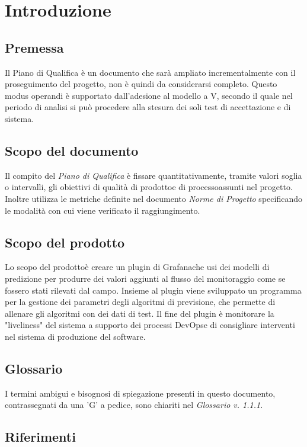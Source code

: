 \section{Introduzione}
	\subsection{Premessa}
	Il Piano di Qualifica è un documento che sarà ampliato incrementalmente con il proseguimento del progetto\glo, non è quindi da considerarsi completo. Questo modus operandi è supportato dall'adesione al modello a V\glo, secondo il quale nel periodo di analisi si può procedere alla stesura dei soli test di accettazione e di sistema.
	
	\subsection{Scopo del documento}
	Il compito del \textit{Piano di Qualifica} è fissare quantitativamente, tramite valori soglia o intervalli, gli obiettivi di qualità di prodotto\glosp e di processo\glosp assunti nel progetto\glo. Inoltre utilizza le metriche definite nel documento \textit{Norme di Progetto} specificando le modalità con cui viene verificato il raggiungimento.

	\subsection{Scopo del prodotto}
	Lo scopo del prodotto\glosp è creare un plugin di Grafana\glosp che usi dei modelli di predizione per produrre dei valori aggiunti al flusso del monitoraggio come se fossero stati rilevati dal campo. Insieme al plugin viene sviluppato un programma per la gestione dei parametri degli algoritmi di previsione, che permette di allenare gli algoritmi con dei dati di test. Il fine del plugin è monitorare la "liveliness" del sistema a supporto dei processi DevOps\glosp e di consigliare interventi nel sistema di produzione del software.
	
	\subsection{Glossario}
	I termini ambigui e bisognosi di spiegazione presenti in questo documento, contrassegnati da una 'G' a pedice, sono chiariti nel \textit{Glossario v. 1.1.1}.
	
	\subsection{Riferimenti}
